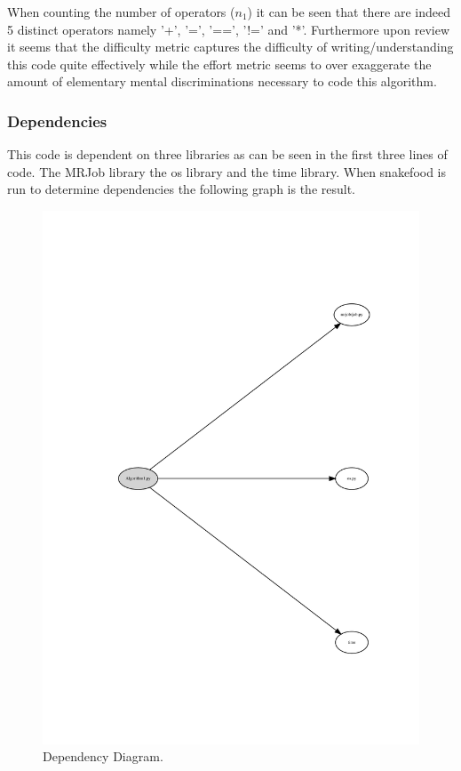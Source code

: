 \documentclass[10.5pt,journal, a4paper]{IEEEtran}
\begin{document}
\noindent
When counting the number of operators ($n_{1}$) it can be seen that there are indeed 5 distinct operators namely '+', '=', '==', '!=' and '*'. Furthermore upon review it seems that the difficulty metric captures the difficulty of writing/understanding this code quite effectively while the effort metric seems to over exaggerate the amount of elementary mental discriminations necessary to code this algorithm. 

\subsubsection{Dependencies}
\noindent
This code is dependent on three libraries as can be seen in the first three lines of code. The MRJob library the os library and the time library. When snakefood is run to determine dependencies the following graph is the result. 

 \begin{figure}[H]
 \centering 
 \includegraphics[width=\columnwidth]{Algo1}
 \centering 
  \caption {Dependency Diagram. }
 \end{figure}
\end{document}
